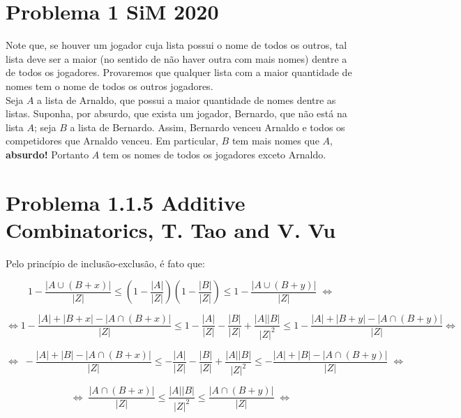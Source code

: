 \section{Problema 1 SiM 2020}

Note que, se houver um jogador cuja lista possui o nome de todos os outros, tal lista deve ser a maior (no sentido de não haver outra com mais nomes) dentre a de todos os jogadores. Provaremos que qualquer lista com a maior quantidade de nomes tem o nome de todos os outros jogadores.\\

Seja $A$ a lista de Arnaldo, que possui a maior quantidade de nomes dentre as listas. Suponha, por absurdo, que exista um jogador, Bernardo, que não está na lista $A$; seja $B$ a lista de Bernardo. Assim, Bernardo venceu Arnaldo e todos os competidores que Arnaldo venceu. Em particular, $B$ tem mais nomes que $A$, \textbf{absurdo!} Portanto $A$ tem os nomes de todos os jogadores exceto Arnaldo.

\section{Problema 1.1.5 Additive Combinatorics, T. Tao and V. Vu}

Pelo princípio de inclusão-exclusão, é fato que:

$$1-\frac{|A\cup (B+x)|}{|Z|}\le \left(1-\frac{|A|}{|Z|}\right) \left(1-\frac{|B|}{|Z|}\right)\le 1-\frac{|A\cup (B+y)|}{|Z|}\; \Leftrightarrow$$

$$\Leftrightarrow 1 - \frac{|A|+|B+x|-|A \cap (B+x)|}{|Z|}\le 1 - \frac{|A|}{|Z|} - \frac{|B|}{|Z|} + \frac{|A||B|}{|Z|^2}\le 1 - \frac{|A|+|B+y|-|A \cap (B+y)|}{|Z|} \Leftrightarrow$$

$$\Leftrightarrow \; -\frac{|A|+|B|-|A \cap (B+x)|}{|Z|}\le - \frac{|A|}{|Z|} - \frac{|B|}{|Z|} + \frac{|A||B|}{|Z|^2}\le -\frac{|A|+|B|-|A \cap (B+y)|}{|Z|}\; \Leftrightarrow$$

$$\Leftrightarrow \; \frac{|A\cap (B+x)|}{|Z|}\le \frac{|A||B|}{|Z|^2}\le \frac{|A\cap (B+y)|}{|Z|} \; \Leftrightarrow$$

